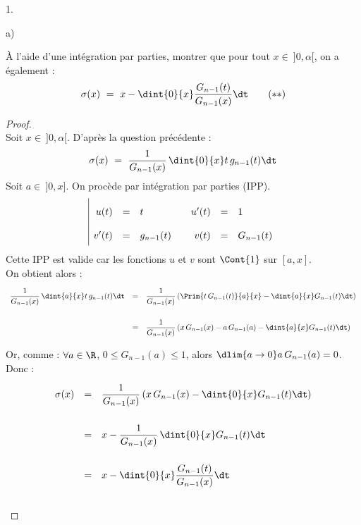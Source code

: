 \documentclass[11pt]{article}%
\begin{document}
\begin{noliste}{1.}
\begin{noliste}{a)}
    \item À l'aide d'une intégration par parties, montrer que pour tout
    $x \in \ ]0,\alpha[$, on a également : 
    \[
      \sigma(x) \ = \ x - \dint{0}{x} \dfrac{G_{n-1}(t)}{G_{n-1}(x)}
      \dt \qquad (**)
    \]
    
    \begin{proof}~\\
      Soit $x \in \ ]0,\alpha[$. D'après la question précédente :
      \[
        \sigma(x) \ = \ \dfrac{1}{G_{n-1}(x)} \, \dint{0}{x} t \,
        g_{n-1}(t) \dt
      \]
      Soit $a \in \ ]0, x]$. On procède par intégration par parties 
      (IPP).
      \[
        \renewcommand{\arraystretch}{2}
        \begin{array}{|rcl@{\qquad}rcl}
          u(t) & = & t & u'(t) & = & 1 \\
          v'(t) & = & g_{n-1}(t) & v(t) & = & G_{n-1}(t)
        \end{array}
        \]
      Cette IPP est valide car les fonctions $u$ et $v$ sont 
      $\Cont{1}$ sur $[a, x]$.\\
      On obtient alors :
      \[
        \begin{array}{rcl}
          \dfrac{1}{G_{n-1}(x)} \, \dint{a}{x} t \, g_{n-1}(t) \dt
          & = & \dfrac{1}{G_{n-1}(x)} \left( \Prim{t \, G_{n-1}(t)}
          {a}{x} - \dint{a}{x} G_{n-1}(t) \dt\right)
          \\[.6cm]
          & = & \dfrac{1}{G_{n-1}(x)} \left( x \, G_{n-1}(x) - 
          a \, G_{n-1}(a) - \dint{a}{x} G_{n-1}(t) \dt \right)
        \end{array}
      \]
      
      
      
      
      Or, comme : $\forall a \in \R$, $0 \leq G_{n-1}(a) \leq 1$, alors 
      $\dlim{a \to 0} a \, 
      G_{n-1}(a) =0$. Donc :
      \[
        \begin{array}{rcl}
          \sigma(x) & = & \dfrac{1}{G_{n-1}(x)} \left( x \, G_{n-1}(x)
          - \dint{0}{x} G_{n-1}(t) \dt \right)
          \\[.6cm]
          & = & x - \dfrac{1}{G_{n-1}(x)} \, \dint{0}{x} G_{n-1}(t) \dt
          \\[.6cm]
          & = & x - \dint{0}{x} \dfrac{G_{n-1}(t)}{G_{n-1}(x)} \dt
        \end{array}
      \]
      \conc{$\forall x \in \ ]0,\alpha[$, $\sigma(x) = x - \dint{0}{x}
      \dfrac{G_{n-1}(t)}{G_{n-1}(x)} \dt$}~\\[-1cm]
    \end{proof}
  \end{noliste}
  

\end{noliste}
\end{document}
